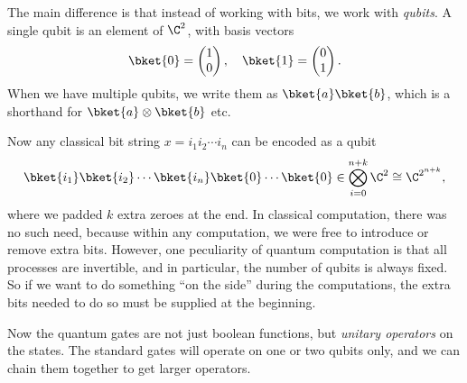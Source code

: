 \documentclass[a4paper]{article}
\begin{document}
The main difference is that instead of working with bits, we work with \emph{qubits}. A single qubit is an element of $\C^2$, with basis vectors
\[
  \bket{0} =
  \begin{pmatrix}
    1 \\ 0
  \end{pmatrix},\quad
  \bket{1} =
  \begin{pmatrix}
    0 \\ 1
  \end{pmatrix}.
\]
When we have multiple qubits, we write them as $\bket{a}\bket{b}$, which is a shorthand for $\bket{a} \otimes \bket{b}$ etc.

Now any classical bit string $x = i_1 i_2 \cdots i_n$ can be encoded as a qubit
\[
  \bket{i_1} \bket{i_2}\cdots\bket{i_n}\bket{0}\cdots\bket{0} \in \bigotimes_{i = 0}^{n + k} \C^2 \cong \C^{2^{n + k}},
\]
where we padded $k$ extra zeroes at the end. In classical computation, there was no such need, because within any computation, we were free to introduce or remove extra bits. However, one peculiarity of quantum computation is that all processes are invertible, and in particular, the number of qubits is always fixed. So if we want to do something ``on the side'' during the computations, the extra bits needed to do so must be supplied at the beginning.

Now the quantum gates are not just boolean functions, but \emph{unitary operators} on the states. The standard gates will operate on one or two qubits only, and we can chain them together to get larger operators.
\end{document}
